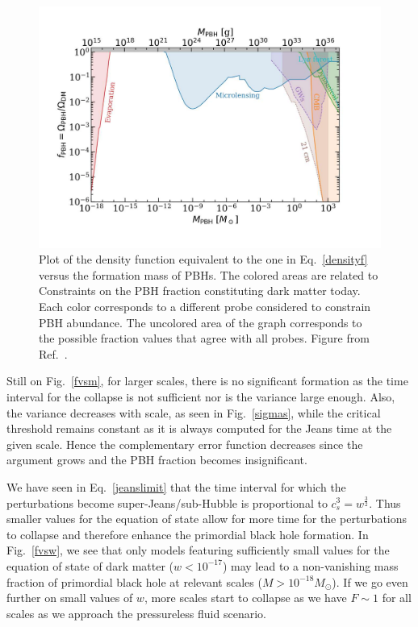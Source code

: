 \documentclass[a4paper,11pt]{article}
\begin{document}
\begin{figure}[tbp]
	\centering
	\includegraphics[width=1.0\linewidth]{pbh_dm}
	\caption{Plot of the density function equivalent to the one in Eq.~\eqref{densityf} versus the formation mass of PBHs. The colored areas are related to Constraints on the PBH fraction constituting dark matter today. Each color corresponds to a different probe considered to constrain PBH abundance. The uncolored area of the graph corresponds to the possible fraction values that agree with all probes. Figure from Ref.~\cite{Villanueva2021}.}
	\label{fig:pbhdm}
\end{figure}

Still on Fig.~\ref{fvsm}, for larger scales, there is no significant formation as the time interval for the collapse is not sufficient nor is the variance large enough. Also, the variance decreases with scale, as seen in Fig.~\ref{sigmas}, while the critical threshold remains constant as it is always computed for the Jeans time at the given scale. Hence the complementary error function decreases since the argument grows and the PBH fraction becomes insignificant.

We have seen in Eq.~\eqref{jeanslimit} that the time interval for which the perturbations become super-Jeans/sub-Hubble is proportional to $c_s^3 = w^{\frac{3}{2}}$. Thus smaller values for the equation of state allow for more time for the perturbations to collapse and therefore enhance the primordial black hole formation. In Fig.~\ref{fvsw}, we see that only models featuring sufficiently small values for the equation of state of dark matter ($w < 10^{-17}$) may lead to a non-vanishing mass fraction of primordial black hole at relevant scales ($M >  10^{-18}M_\odot$). If we go even further on small values of $w$, more scales start to collapse as we have $F\sim 1$ for all scales as we approach the pressureless fluid scenario.
\end{document}
